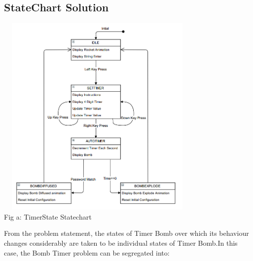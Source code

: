 \documentclass[a4paper,12pt,oneside]{book}
\begin{document}
\subsection{StateChart Solution}
\begin{center}
\includegraphics[width=10cm,height=10cm]{TimedBombImages/BombTimerStateChart}
\\{\small Fig a: TimerState Statechart} 
\end{center}
\qquad From the problem statement, the states of Timer Bomb over which its behaviour changes considerably are taken to be individual states of Timer Bomb.In this case, the Bomb Timer problem can be segregated into:
\end{document}
